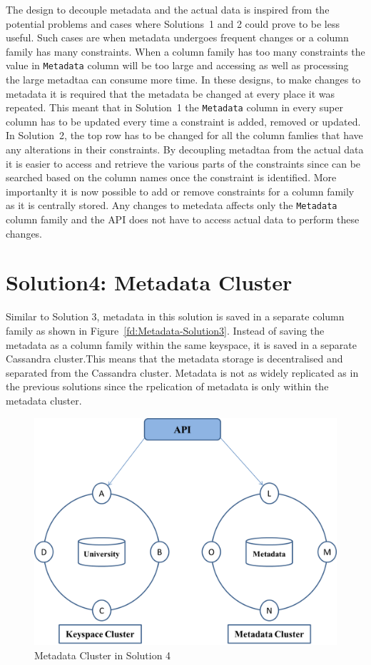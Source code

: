 The design to decouple metadata and the actual data is inspired from the
potential problems and cases where Solutions~1 and 2 could prove to be less
useful. Such cases are when metadata undergoes frequent changes or a column
family has many constraints. When a column family has too many constraints the
value in \texttt{Metadata} column will be too large and accessing as well as
processing the large metadtaa can consume more time. In these designs, to make
changes to metadata it is required that the metadata be changed at every place
it was repeated. This meant that in Solution~1 the \texttt{Metadata} column in
every super column has to be updated every time a constraint is added, removed
or updated. In Solution~2, the top row has to be changed for all the column
famlies that have any alterations  in their constraints.
By decoupling metadtaa from the actual data it is  easier to access and retrieve
the various parts of the constraints since can be searched based on the column
names once the constraint is identified.
More importanlty it is now possible to add or remove constraints for a column
family as it is centrally stored. Any changes to metedata affects only the
\texttt{Metadata} column family and the \ac{API} does not have to access actual
data to perform these changes. 

\section{Solution4:  Metadata Cluster} \label{s:design-sol4}

Similar to Solution 3, metadata in this solution is saved in a separate column
family as shown in Figure~\ref{fd:Metadata-Solution3}. Instead of saving the
metadata as a column family within the same keyspace, it is saved in a separate
Cassandra cluster.This means that the metadata storage is decentralised and separated from the
Cassandra cluster. Metadata  is not as widely replicated as in the previous
solutions since the rpelication of metadata is only within the metadata cluster. 


\begin{figure}[h]
	\centering
	\includegraphics[width=.6\textwidth]{./figure/Solutions/Sol4-cluster-pic.png}
	\caption{Metadata Cluster in Solution
	4}\label{fd:MetadataCluster-Solution4}
	
\end{figure}

